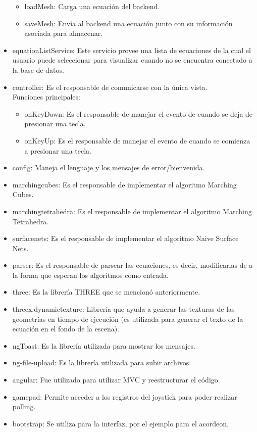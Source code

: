 \documentclass[12pt]{article}
\begin{document}
\begin{itemize}
\begin{itemize}
	\item loadMesh: Carga una ecuación del backend.
	\item saveMesh: Envía al backend una ecuación junto con su información asociada para almacenar.
	\end{itemize}
\item equationListService: Este servicio provee una lista de ecuaciones de la cual el usuario puede seleccionar para visualizar cuando no se encuentra conectado a la base de datos.
\item controller: Es el responsable de comunicarse con la única vista.
	\\Funciones principales:
	\begin{itemize}
	\item onKeyDown: Es el responsable de manejar el evento de cuando se deja de presionar una tecla.
	\item onKeyUp: Es el responsable de manejar el evento de cuando se comienza a presionar una tecla.
	\end{itemize}
\item config: Maneja el lenguaje y los mensajes de error/bienvenida.
\item marchingcubes: Es el responsable de implementar el algoritmo Marching Cubes.
\item marchingtetrahedra: Es el responsable de implementar el algoritmo Marching Tetrahedra.
\item surfacenets: Es el responsable de implementar el algoritmo Naive Surface Nets.
\item parser: Es el responsable de parsear las ecuaciones, es decir, modificarlas de a la forma que esperan los algoritmos como entrada.
\item three: Es la librería THREE que se mencionó anteriormente.
\item threex.dynamictexture: Librería que ayuda a generar las texturas de las geometrías en tiempo de ejecución (es utilizada para generar el texto de la ecuación en el fondo de la escena).
\item ngToast: Es la librería utilizada para mostrar los mensajes.
\item ng-file-upload: Es la librería utilizada para subir archivos.
\item angular: Fue utilizado para utilizar MVC y reestructurar el código.
\item gamepad: Permite acceder a los registros del joystick para poder realizar polling.
\item bootstrap: Se utiliza para la interfaz, por el ejemplo para el acordeon.

\end{itemize}
\end{document}

